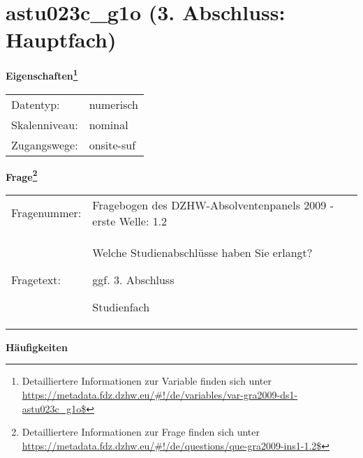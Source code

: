 
    \setcounter{footnote}{0}

    \vspace*{-1.8cm}
	\section{astu023c\_g1o (3. Abschluss: Hauptfach)}
	\label{section:astu023c_g1o}



    \vspace*{0.5cm}
    \noindent\textbf{Eigenschaften\footnote{Detailliertere Informationen zur Variable finden sich unter
		\url{https://metadata.fdz.dzhw.eu/\#!/de/variables/var-gra2009-ds1-astu023c_g1o$}}}\\
	\begin{tabularx}{\hsize}{@{}lX}
	Datentyp: & numerisch \\
	Skalenniveau: & nominal \\
	Zugangswege: &
	  onsite-suf
 \\
    \end{tabularx}



				\vspace*{0.5cm}
                \noindent\textbf{Frage\footnote{Detailliertere Informationen zur Frage finden sich unter
		              \url{https://metadata.fdz.dzhw.eu/\#!/de/questions/que-gra2009-ins1-1.2$}}}\\
				\begin{tabularx}{\hsize}{@{}lX}
					Fragenummer: &
					  Fragebogen des DZHW-Absolventenpanels 2009 - erste Welle:
					  1.2
 \\
					Fragetext: & Welche Studienabschlüsse haben Sie erlangt?\par  ggf. 3. Abschluss\par  Studienfach \\
				\end{tabularx}





        		\vspace*{0.5cm}
                \noindent\textbf{Häufigkeiten}

